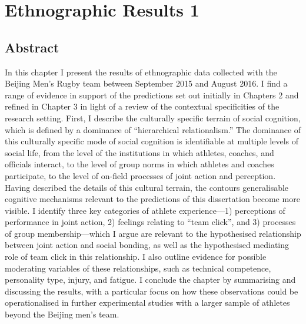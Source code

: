 \chapter{\label{4ethnographicField}Ethnographic Results 1}

  \minitoc



  \section{Abstract}
  In this chapter I present the results of ethnographic data collected with the Beijing Men's Rugby team between September 2015 and August 2016.  I find a range of evidence in support of the predictions set out initially in Chapters 2 and refined in Chapter 3 in light of a review of the contextual specificities of the research setting.  First, I describe the culturally specific terrain of social cognition, which is defined by a dominance of ``hierarchical relationalism.''  The dominance of this culturally specific mode of social cognition is identifiable at multiple levels of social life, from the level of the institutions in which athletes, coaches, and officials interact, to the level of group norms in which athletes and coaches participate, to the level of on-field processes of joint action and perception. Having described the details of this cultural terrain, the contours generalisable cognitive mechanisms relevant to the predictions of this dissertation become more visible. I identify three key categories of athlete experience---1) perceptions of performance in joint action, 2) feelings relating to ``team click'', and 3) processes of group membership---which I argue are relevant to the hypothesised relationship between joint action and social bonding, as well as the hypothesised mediating role of team click in this relationship. I also outline evidence for possible moderating variables of these relationships, such as technical competence, personality type, injury, and fatigue. I conclude the chapter by summarising and discussing the results, with a particular focus on how these observations could be operationalised in further experimental studies with a larger sample of athletes beyond the Beijing men's team.

